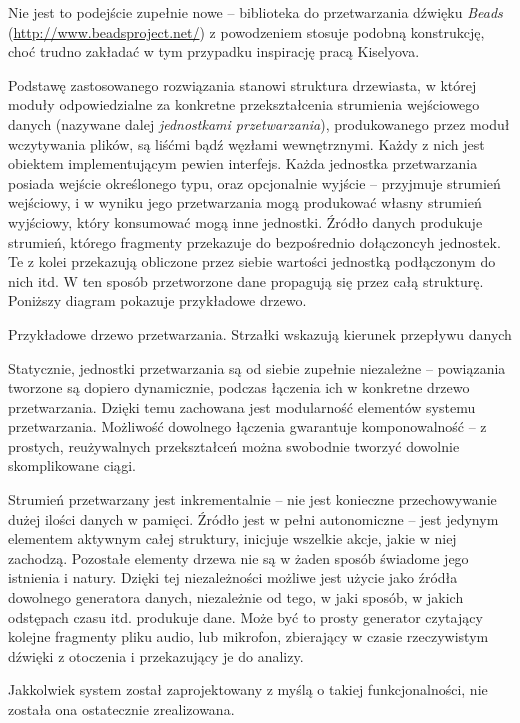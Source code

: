 \begin{Note}
  Nie jest to podejście zupełnie nowe -- biblioteka do przetwarzania dźwięku \emph{Beads}
  (\url{http://www.beadsproject.net/}) z powodzeniem stosuje podobną konstrukcję, choć trudno
  zakładać w tym przypadku inspirację pracą Kiselyova.
\end{Note}

Podstawę zastosowanego rozwiązania stanowi struktura drzewiasta, w której moduły odpowiedzialne za
konkretne przekształcenia strumienia wejściowego danych (nazywane dalej \emph{jednostkami
przetwarzania}), produkowanego przez moduł wczytywania plików, są liśćmi bądź węzłami wewnętrznymi.
Każdy z nich jest obiektem implementującym pewien interfejs.  Każda jednostka przetwarzania posiada
wejście określonego typu, oraz opcjonalnie wyjście -- przyjmuje strumień wejściowy, i w wyniku jego
przetwarzania mogą produkować własny strumień wyjściowy, który konsumować mogą inne jednostki.
Źródło danych produkuje strumień, którego fragmenty przekazuje do bezpośrednio dołączoncyh
jednostek. Te z kolei przekazują obliczone przez siebie wartości jednostką podłączonym do nich itd.
W ten sposób przetworzone dane propagują się przez całą strukturę. Poniższy diagram pokazuje
przykładowe drzewo.


{Przykładowe drzewo przetwarzania. Strzałki wskazują kierunek przepływu danych}


Statycznie, jednostki przetwarzania są od siebie zupełnie niezależne -- powiązania tworzone są
dopiero dynamicznie, podczas łączenia ich w konkretne drzewo przetwarzania. Dzięki temu zachowana
jest modularność elementów systemu przetwarzania. Możliwość dowolnego łączenia gwarantuje
komponowalność -- z prostych, reużywalnych przekształceń można swobodnie tworzyć dowolnie
skomplikowane ciągi.

Strumień przetwarzany jest inkrementalnie -- nie jest konieczne przechowywanie dużej ilości danych w
pamięci. Źródło jest w pełni autonomiczne -- jest jedynym elementem aktywnym całej struktury,
inicjuje wszelkie akcje, jakie w niej zachodzą. Pozostałe elementy drzewa nie są w żaden sposób
świadome jego istnienia i natury. Dzięki tej niezależności możliwe jest użycie jako źródła dowolnego
generatora danych, niezależnie od tego, w jaki sposób, w jakich odstępach czasu itd. produkuje dane.
Może być to prosty generator czytający kolejne fragmenty pliku audio, lub mikrofon, zbierający w
czasie rzeczywistym dźwięki z otoczenia i przekazujący je do analizy.

\begin{Note}
  Jakkolwiek system został zaprojektowany z myślą o takiej funkcjonalności, nie została ona
  ostatecznie zrealizowana.
\end{Note}


